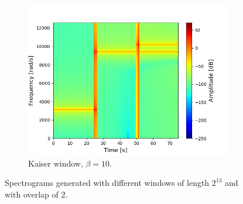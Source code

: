\begin{figure}[H]
\begin{subfigure}{0.49\textwidth}
\includegraphics[width=\textwidth]{figures/stft_windows/kaiser/10000/10.png}
\caption{Kaiser window, $\beta=10$.}
\label{fig:stft_kaiser_10000_10}
\end{subfigure}

\caption{Spectrograms generated with different windows of length $2^{13}$ and with overlap of 2.}
\label{fig:stft_windows_10000}
\end{figure}

